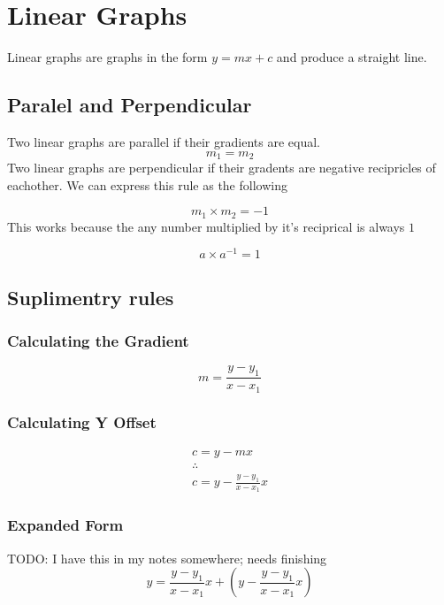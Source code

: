 \documentclass{article}
\begin{document}
\section{Linear Graphs}
Linear graphs are graphs in the form $y = mx + c$ and produce a straight line.

\subsection{Paralel and Perpendicular}
Two linear graphs are parallel if their gradients are equal.
\begin{equation}
	m_1 = m_2
\end{equation}
Two linear graphs are perpendicular if their gradents are negative recipricles of eachother. We can express this rule as the following

\begin{equation}
	m_1 \times m_2 = -1
\end{equation}
This works because the any number multiplied by it's reciprical is always $1$

\begin{equation}
	a \times a^{-1} = 1
\end{equation}

\subsection{Suplimentry rules}

\subsubsection{Calculating the Gradient}

\begin{equation}
	m = \frac{y - y_1}{x - x_1}
\end{equation}

\subsubsection{Calculating Y Offset}
\begin{gather*}
	c = y - mx\\
	\therefore\\
	c = y - \frac{y - y_1}{x - x_1}x
\end{gather*}
\subsubsection{Expanded Form}
TODO: I have this in my notes somewhere; needs finishing
\begin{equation}
	y = \frac{y - y_1}{x - x_1}x + \left (y - \frac{y - y_1}{x - x_1}x \right )
\end{equation}



\enddocument
\end{document}
